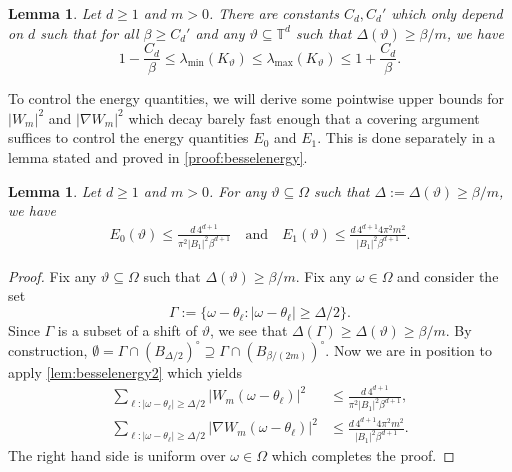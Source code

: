 \documentclass[11pt]{article}
\newtheorem{lemma}[theorem]{Lemma}
\theoremstyle{definition}
\numberwithin{theorem}{section}
\numberwithin{lemma}{section}
\numberwithin{equation}{section}
\def\T{\mathbb{T}}
\renewcommand{\supset}{\supseteq}
\renewcommand{\subset}{\subseteq}
\def\andspace{\quad\text{and}\quad}
\numberwithin{equation}{section}
\begin{document}
	\begin{lemma}
		\label{lem:orthogonalityball}
		Let $d\geq 1$ and $m>0$. There are constants $C_d, C_d'$ which only depend on $d$ such that for all $\beta\geq C_d'$ and any $\vartheta\subset \T^d$ such that $\Delta(\vartheta)\geq \beta/m$, we have
		$$
		1-\frac{C_d}{\beta}
		\leq \lambda_{\min}(K_\vartheta)
		\leq \lambda_{\max}(K_\vartheta)
		\leq 1+ \frac{C_d}{\beta}.
		$$
	\end{lemma}	
	
	To control the energy quantities, we will derive some pointwise upper bounds for $|W_m|^2$ and $|\nabla W_m|^2$ which decay barely fast enough that a covering argument suffices to control the energy quantities $E_0$ and $E_1$. This is done separately in a lemma stated and proved in \cref{proof:besselenergy}. 
	
	\begin{lemma}
		\label{lem:besselenergy}
		Let $d\geq 1$ and $m>0$. For any $\vartheta\subset\Omega$ such that $\Delta:=\Delta(\vartheta)\geq \beta/m$, we have
		\begin{align*}
			E_0(\vartheta)
			\leq \frac{d\, 4^{d+1}}{\pi^2 |B_1|^2 \beta^{d+1}} \andspace 
			E_1(\vartheta)
			\leq \frac{d \, 4^{d+1} 4\pi^2 m^2 }{|B_1|^2 \beta^{d+1}}.
		\end{align*}
	\end{lemma}
	
	\begin{proof}
		Fix any $\vartheta\subset \Omega$ such that $\Delta(\vartheta)\geq \beta/m$. Fix any $\omega\in\Omega$ and consider the set
		$$
		\Gamma:=\{\omega-\theta_\ell\colon |\omega-\theta_\ell|\geq \Delta/2\}. 
		$$
		Since $\Gamma$ is a subset of a shift of $\vartheta$, we see that $\Delta(\Gamma)\geq \Delta(\vartheta)\geq \beta/m$. By construction, $\emptyset=\Gamma\cap (B_{\Delta/2})^\circ\supset \Gamma\cap (B_{\beta/(2m)})^\circ$. Now we are in position to apply \cref{lem:besselenergy2} which yields 
		\begin{align*}
			\sum_{\ell\colon |\omega-\theta_\ell|\geq \Delta/2} |W_m(\omega-\theta_\ell)|^2
			&\leq \frac{d\, 4^{d+1}}{\pi^2 |B_1|^2 \beta^{d+1}}, \\
			\sum_{\ell\colon |\omega-\theta_\ell|\geq \Delta/2} |\nabla W_m(\omega-\theta_\ell)|^2
			&\leq \frac{d \, 4^{d+1} 4\pi^2 m^2 }{|B_1|^2 \beta^{d+1}}.
		\end{align*}
		The right hand side is uniform over $\omega\in\Omega$ which completes the proof. 	
	\end{proof}
	
\end{document}
